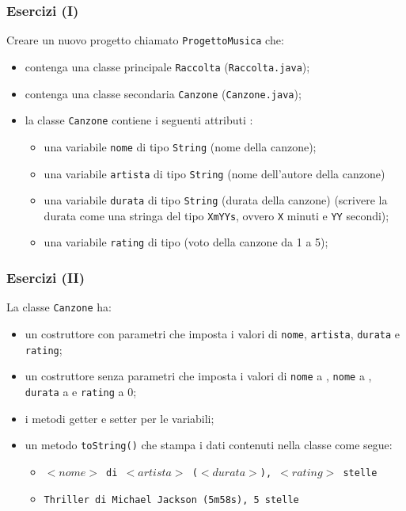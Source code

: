 
\begin{frame}[fragile]\frametitle{Esercizi (I)}

  Creare un nuovo progetto chiamato \texttt{ProgettoMusica} che:
  \begin{itemize}
   \item contenga una classe principale \texttt{Raccolta} (\texttt{Raccolta.java});
   \item contenga una classe secondaria \texttt{Canzone} (\texttt{Canzone.java});
   \item la classe \texttt{Canzone} contiene i seguenti attributi \Jprivate{}:
   \begin{itemize}
    \item una variabile \texttt{nome} di tipo \texttt{String} (nome della canzone);
    \item una variabile \texttt{artista} di tipo \texttt{String} (nome dell'autore della canzone)
    \item una variabile \texttt{durata} di tipo \texttt{String} (durata della canzone)
    {\footnotesize (scrivere la durata come una stringa del tipo \texttt{XmYYs}, ovvero \texttt{X} minuti e \texttt{YY} secondi)};
    \item una variabile \texttt{rating} di tipo \texttt{\Jint} (voto della canzone da 1 a 5);
    \end{itemize}
  \end{itemize}
\end{frame}

\begin{frame}[fragile]\frametitle{Esercizi (II)}

  La classe \texttt{Canzone} ha:
  \begin{itemize}
   \item un costruttore con parametri che imposta i valori di \texttt{nome}, \texttt{artista}, \texttt{durata} e \texttt{rating};
   \item un costruttore senza parametri che imposta i valori di \texttt{nome} a , \texttt{nome} a , 
   \texttt{durata} a  e \texttt{rating} a 0;
   \item i metodi getter e setter per le variabili;
   \item un metodo \texttt{toString()} che stampa i dati contenuti nella classe come segue:
   \begin{itemize}
    \item \texttt{$<nome>$ di $<artista>$ ($<durata>$), $<rating>$ stelle}
    \item \texttt{Thriller di Michael Jackson (5m58s), 5 stelle}
   \end{itemize}
  \end{itemize}

\end{frame}

